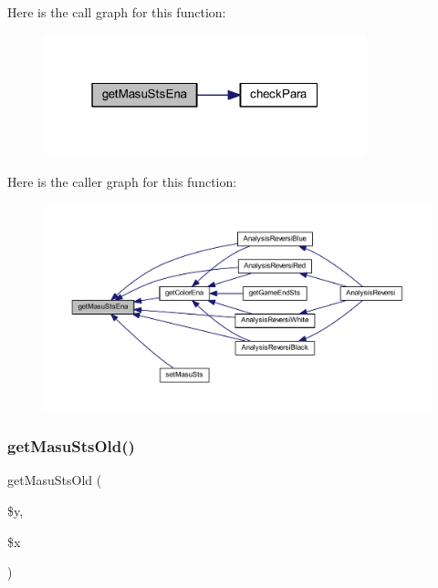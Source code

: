 Here is the call graph for this function\+:
\nopagebreak
\begin{figure}[H]
\begin{center}
\leavevmode
\includegraphics[width=265pt]{class_reversi_a22088e18c7f837f49093595261c30e4e_cgraph}
\end{center}
\end{figure}
Here is the caller graph for this function\+:
\nopagebreak
\begin{figure}[H]
\begin{center}
\leavevmode
\includegraphics[width=350pt]{class_reversi_a22088e18c7f837f49093595261c30e4e_icgraph}
\end{center}
\end{figure}
\mbox{\label{class_reversi_a1688a929d3917e19510f6501c42d6a2b}} 
\subsubsection{\texorpdfstring{get\+Masu\+Sts\+Old()}{getMasuStsOld()}}
{\footnotesize\ttfamily get\+Masu\+Sts\+Old (\begin{DoxyParamCaption}\item[{}]{\$y,  }\item[{}]{\$x }\end{DoxyParamCaption})}



